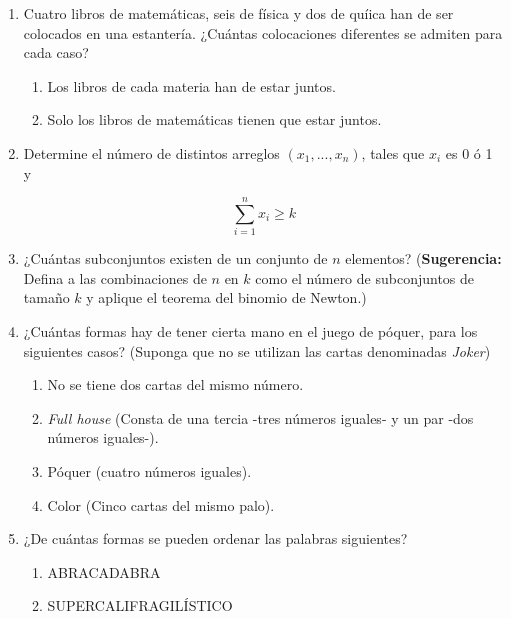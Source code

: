 \documentclass[10pt,a4paper]{article}
\begin{document}
\begin{enumerate}
		\item Cuatro libros de matemáticas, seis de física y dos de quíica han de ser colocados en una estantería. ¿Cuántas colocaciones diferentes se admiten para cada caso?
		\begin{enumerate}
			\item Los libros de cada materia han de estar juntos.
			\item Solo los libros de matemáticas tienen que estar juntos.
		\end{enumerate}
	
		\item Determine el número de distintos arreglos $(x_1, . . . , x_n)$, tales que $x_i$ es 0 ó 1 y
		
		\[
		\sum_{i=1}^{n} x_i \ge k 
		\]
		
		\item ¿Cuántas subconjuntos existen de un conjunto de $n$ elementos? (\textbf{Sugerencia:} Defina a las combinaciones de $n$ en $k$ como el número de subconjuntos de tamaño $k$ y aplique el teorema del binomio de Newton.)
		
		\item ¿Cuántas formas hay de tener cierta mano en el juego de póquer, para los siguientes casos? (Suponga que no se utilizan las cartas denominadas \textit{Joker})
		\begin{enumerate}
			\item No se tiene dos cartas del mismo número.
			\item \textit{Full house} (Consta de una tercia -tres números iguales- y un par -dos números iguales-).
			\item Póquer (cuatro números iguales).
			\item Color (Cinco cartas del mismo palo).
		\end{enumerate}
	
		\item ¿De cuántas formas se pueden ordenar las palabras siguientes?
		\begin{enumerate}
			\item ABRACADABRA
			\item SUPERCALIFRAGILÍSTICO
		\end{enumerate}
		
	\end{enumerate}
	
\end{document}
